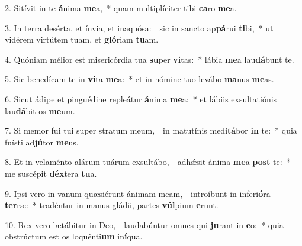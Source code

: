 
2. Sitívit in te \textbf{á}nima \textbf{me}a,~* quam multiplíciter tibi \textbf{ca}ro \textbf{me}a.

3. In terra desérta, et ínvia, et inaquósa:~\GreDagger\ sic in sancto ap\textbf{pá}rui \textbf{ti}bi,~* ut vidérem virtútem tuam, et \textbf{gló}riam \textbf{tu}am.

4. Quóniam mélior est misericórdia tua \textbf{su}per \textbf{vi}tas:~* lábia \textbf{me}a lau\textbf{dá}bunt te.

5. Sic benedícam te in \textbf{vi}ta \textbf{me}a:~* et in nómine tuo levábo \textbf{ma}nus \textbf{me}as.

6. Sicut ádipe et pinguédine repleátur \textbf{á}nima \textbf{me}a:~* et lábiis exsultatiónis lau\textbf{dá}bit os \textbf{me}um.

7. Si memor fui tui super stratum meum,~\GreDagger\ in matutínis medi\textbf{tá}bor \textbf{in} te:~* quia fuísti ad\textbf{jú}tor \textbf{me}us.

8. Et in velaménto alárum tuárum exsultábo,~\GreDagger\ adh\'{\ae}sit ánima \textbf{me}a \textbf{post} te:~* me suscépit \textbf{déx}tera \textbf{tu}a.

9. Ipsi vero in vanum quæsiérunt ánimam meam,~\GreDagger\ introíbunt in inferi\textbf{ó}ra \textbf{ter}ræ:~* tradéntur in manus gládii, partes \textbf{vúl}pium \textbf{e}runt.

10. Rex vero lætábitur in Deo,~\GreDagger\ laudabúntur omnes qui \textbf{ju}rant in \textbf{e}o:~* quia obstrúctum est os loquénti\textbf{um} in\textbf{í}qua.

